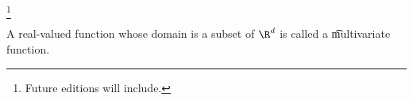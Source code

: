 
\footnote{Future editions will include.}


A real-valued function whose domain is a subset of $\R^d$ is called a \t{multivariate function}.

\blankpage
